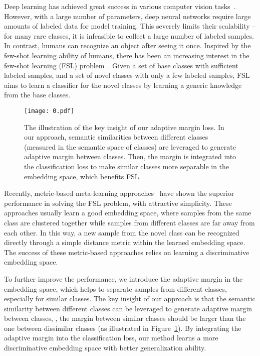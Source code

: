 \documentclass[10pt,twocolumn,letterpaper]{article}
\begin{document}
Deep learning has achieved great success in various computer vision tasks~\cite{Russakovsky2015ImageNet,he2016cvpr}. However, with a large number of parameters, deep neural networks require large amounts of labeled data for model training. This severely limits their scalability -- for many rare classes, it is infeasible to collect a large number of labeled samples. In contrast, humans can recognize an object after seeing it once. Inspired by the few-shot learning ability of humans, there has been an increasing interest in the few-shot learning (FSL) problem~\cite{Ren2018arxiv,Snell2017nips,Douze2018cvpr,Li2019CVPR}. Given a set of base classes with sufficient labeled samples, and a set of novel classes with only a few labeled samples, FSL aims to learn a classifier for the novel classes by learning a generic knowledge from the base classes.


\begin{figure}[t]
\begin{center}
\texttt{[image: 0.pdf]}
\end{center}
\caption{The illustration of the key insight of our adaptive margin loss. In our approach, semantic similarities between different classes (measured in the semantic space of classes) are leveraged to generate adaptive margin between classes. Then, the margin is integrated into the classification loss to make similar classes more separable in the embedding space, which benefits FSL.}
\label{fig0}
\end{figure}

Recently, metric-based meta-learning approaches~\cite{Snell2017nips,Li2017arxiv,Gidaris2018cvpr,Sung2018cvpr,Li2019ICCV} have shown the superior performance in solving the FSL problem, with attractive simplicity. These approaches usually learn a good embedding space, where samples from the same class are clustered together while samples from different classes are far away from each other. 
In this way, a new sample from the novel class can be recognized directly through a simple distance metric within the learned embedding space. The success of these metric-based approaches relies on learning a discriminative embedding space. 

To further improve the performance, we introduce the adaptive margin in the embedding space, 
which helps to separate samples from different classes, especially for similar classes. 
The key insight of our approach is that the semantic similarity between different classes can be leveraged to generate adaptive margin between classes, \ie, the margin between similar classes should be larger than the one between dissimilar classes (as illustrated in Figure~\ref{fig0}). By integrating the adaptive margin into the classification loss, our method learns a more discriminative embedding space with better generalization ability.
\end{document}
